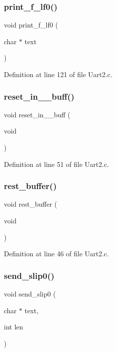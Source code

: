 \subsubsection{print\+\_\+f\+\_\+lf0()}
{\footnotesize\ttfamily void print\+\_\+f\+\_\+lf0 (\begin{DoxyParamCaption}\item[{char $\ast$}]{text }\end{DoxyParamCaption})}



Definition at line 121 of file Uart2.\+c.

\mbox{\label{_uart2_8c_a1a9be6058ee2ceaa226196bb0a73ba34}} 
\subsubsection{reset\+\_\+in\+\_\+\_\+buff()}
{\footnotesize\ttfamily void reset\+\_\+in\+\_\+\_\+buff (\begin{DoxyParamCaption}\item[{void}]{ }\end{DoxyParamCaption})}



Definition at line 51 of file Uart2.\+c.

\mbox{\label{_uart2_8c_a0b08a2684628706e0433f996b36841ff}} 
\subsubsection{rest\+\_\+buffer()}
{\footnotesize\ttfamily void rest\+\_\+buffer (\begin{DoxyParamCaption}\item[{void}]{ }\end{DoxyParamCaption})}



Definition at line 46 of file Uart2.\+c.

\mbox{\label{_uart2_8c_a369624c8eb4925edacf7bd8773dceaa0}} 
\subsubsection{send\+\_\+slip0()}
{\footnotesize\ttfamily void send\+\_\+slip0 (\begin{DoxyParamCaption}\item[{char $\ast$}]{text,  }\item[{int}]{len }\end{DoxyParamCaption})}



